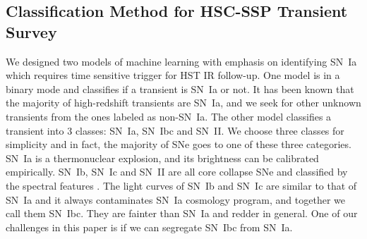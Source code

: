 \documentclass[useamsfonts]{pasj01}
\begin{document}



\subsection{Classification Method for HSC-SSP Transient Survey}
We designed two models of machine learning with emphasis on identifying SN~Ia which requires time sensitive trigger for HST IR follow-up.  One model is in a binary mode and classifies if a transient is SN~Ia or not.
It has been known that the majority of high-redshift transients are SN~Ia, and we seek for other unknown transients
from the ones labeled as non-SN~Ia.   
The other model classifies a transient into 3 classes: SN~Ia, SN~Ibc and SN~II.  
We choose three classes for simplicity and in fact, the majority of SNe goes to one of these three categories.
SN~Ia is a thermonuclear explosion, and its brightness can be calibrated empirically.
SN~Ib, SN~Ic and SN~II are all core collapse SNe and classified by the spectral features \citep{filippenko97a}.
The light curves of SN~Ib and SN~Ic are similar to that of SN~Ia and it always contaminates SN~Ia cosmology program, and together we call them SN~Ibc.  They are fainter than SN~Ia and redder in general.
One of our challenges in this paper is if we can segregate SN~Ibc from SN~Ia.
%
%
%
%
%
%
\end{document}
